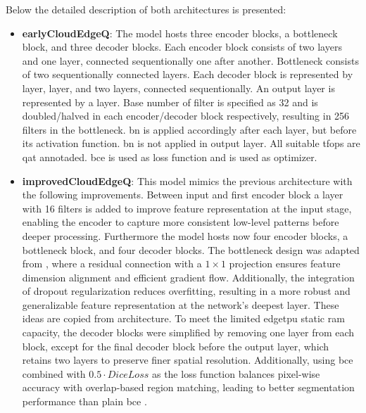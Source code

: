 {Below the detailed description of both architectures is presented:
\begin{itemize}
    \item \textbf{earlyCloudEdgeQ}: The model hosts three encoder blocks, a bottleneck block, and three decoder blocks.
    Each encoder block consists of two  layers and one  layer,
    connected sequentionally one after another. Bottleneck consists of two sequentionally connected  layers.
    Each decoder block is represented by  layer,  layer, and two  layers,
    connected sequentionally. An output layer is represented by a  layer.
    Base number of filter is specified as 32 and is doubled/halved in each encoder/decoder block respectively, resulting in 256 filters in the bottleneck.
    \gls{bn} is applied accordingly after each  layer, but before its activation function. \gls{bn} is not applied in output layer.
    All suitable \glspl{tfop} are \gls{qat} annotaded. \gls{bce} is used as loss function and  \cite{adam} is used as optimizer.
    \item \textbf{improvedCloudEdgeQ}: This model mimics the previous architecture with the following improvements.
    Between input and first encoder block a  layer with 16 filters is added to improve feature representation at the input stage,
    enabling the encoder to capture more consistent low-level patterns before deeper processing.
    Furthermore the model hosts now four encoder blocks, a bottleneck block, and four decoder blocks. The bottleneck design was adapted from ,
    where a residual connection with a $1\times1$ projection ensures feature dimension alignment and efficient gradient flow. Additionally,
    the integration of dropout regularization reduces overfitting, resulting in a more robust and generalizable feature representation at the network's deepest layer.
    These ideas are copied from  architecture.
    To meet the limited \gls{edgetpu} static \gls{ram} capacity, the decoder blocks were simplified by removing one  layer from each block,
    except for the final decoder block before the output layer, which retains two  layers to preserve finer spatial resolution.
    Additionally, using \gls{bce} combined with \ensuremath{0.5 \cdot DiceLoss} as the loss function balances pixel-wise accuracy with overlap-based region matching,
    leading to better segmentation performance than plain \gls{bce} \cite{bcedice1, bcedice2}.


\end{itemize}}
